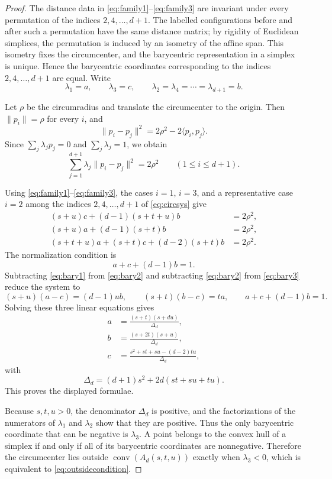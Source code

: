 \documentclass[preprint,12pt]{elsarticle}
\theoremstyle{remark}
\DeclareMathOperator{\conv}{conv}
\begin{document}
\begin{proof}
The distance data in \eqref{eq:family1}--\eqref{eq:family3} are invariant under every permutation of the indices $2,4,\dots,d+1$. The labelled configurations before and after such a permutation have the same distance matrix; by rigidity of Euclidean simplices, the permutation is induced by an isometry of the affine span. This isometry fixes the circumcenter, and the barycentric representation in a simplex is unique. Hence the barycentric coordinates corresponding to the indices $2,4,\dots,d+1$ are equal. Write
\[
\lambda_1=a,
\qquad
\lambda_3=c,
\qquad
\lambda_2=\lambda_4=\cdots=\lambda_{d+1}=b.
\]

Let $\rho$ be the circumradius and translate the circumcenter to the origin. Then $\|p_i\|=\rho$ for every $i$, and
\[
\|p_i-p_j\|^2=2\rho^2-2\langle p_i,p_j\rangle.
\]
Since $\sum_j\lambda_jp_j=0$ and $\sum_j\lambda_j=1$, we obtain
\begin{equation}\label{eq:circsys}
\sum_{j=1}^{d+1}\lambda_j\|p_i-p_j\|^2=2\rho^2
\qquad (1\le i\le d+1).
\end{equation}

Using \eqref{eq:family1}--\eqref{eq:family3}, the cases $i=1$, $i=3$, and a representative case $i=2$ among the indices $2,4,\dots,d+1$ of \eqref{eq:circsys} give
\begin{align}
(s+u)c+(d-1)(s+t+u)b&=2\rho^2, \label{eq:bary1}\\
(s+u)a+(d-1)(s+t)b&=2\rho^2, \label{eq:bary2}\\
(s+t+u)a+(s+t)c+(d-2)(s+t)b&=2\rho^2. \label{eq:bary3}
\end{align}
The normalization condition is
\begin{equation}\label{eq:bary4}
a+c+(d-1)b=1.
\end{equation}
Subtracting \eqref{eq:bary1} from \eqref{eq:bary2} and subtracting \eqref{eq:bary2} from \eqref{eq:bary3} reduce the system to
\[
(s+u)(a-c)=(d-1)ub,
\qquad
(s+t)(b-c)=ta,
\qquad
 a+c+(d-1)b=1.
\]
Solving these three linear equations gives
\begin{align*}
a&=\frac{(s+t)(s+du)}{\Delta_d},\\[1mm]
b&=\frac{(s+2t)(s+u)}{\Delta_d},\\[1mm]
c&=\frac{s^2+st+su-(d-2)tu}{\Delta_d},
\end{align*}
with
\[
\Delta_d=(d+1)s^2+2d(st+su+tu).
\]
This proves the displayed formulae.

Because $s,t,u>0$, the denominator $\Delta_d$ is positive, and the factorizations of the numerators of $\lambda_1$ and $\lambda_2$ show that they are positive. Thus the only barycentric coordinate that can be negative is $\lambda_3$. A point belongs to the convex hull of a simplex if and only if all of its barycentric coordinates are nonnegative. Therefore the circumcenter lies outside $\conv(A_d(s,t,u))$ exactly when $\lambda_3<0$, which is equivalent to \eqref{eq:outsidecondition}.
\end{proof}
\end{document}
